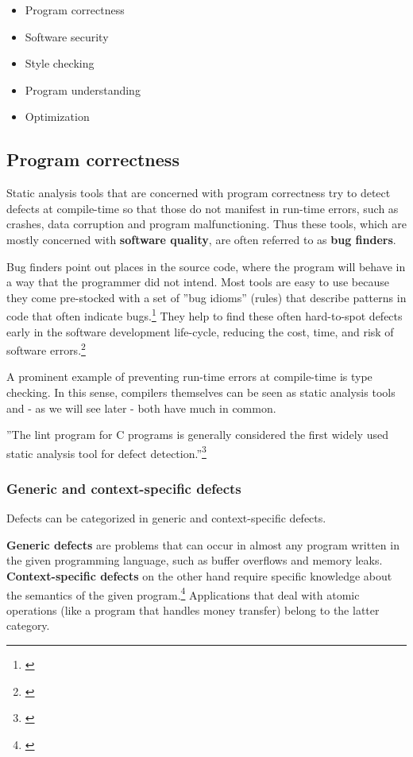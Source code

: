\begin{itemize}\addtolength{\itemsep}{-0.5\baselineskip}
\item Program correctness
\item Software security
\item Style checking
\item Program understanding
\item Optimization
\end{itemize}

\subsection{Program correctness}

Static analysis tools that are concerned with program correctness try to detect defects at compile-time so that those do not manifest in run-time errors, such as crashes, data corruption and program malfunctioning. Thus these tools, which are mostly concerned with \textbf{software quality}, are often referred to as \textbf{bug finders}.

Bug finders point out places in the source code, where the program will behave in a way that the programmer did not intend. Most tools are easy to use because they come pre-stocked with a set of ''bug idioms'' (rules) that describe patterns in code that often indicate bugs.\footnote{\citep[32]{SecureProgramming}} They help to find these often hard-to-spot defects early in the software development life-cycle, reducing the cost, time, and risk of software errors.\footnote{\citep{CovertySA}}

A prominent example of preventing run-time errors at compile-time is type checking. In this sense, compilers themselves can be seen as static analysis tools and - as we will see later - both have much in common.

''The lint program for C programs is generally considered the first widely used static analysis tool for defect detection.''\footnote{\citep[1]{UsingSAToFindBugs}}

\subsubsection{Generic and context-specific defects}

Defects can be categorized in generic and context-specific defects.

\textbf{Generic defects} are problems that can occur in almost any program written in the given programming language, such as buffer overflows and memory leaks.\\
\textbf{Context-specific defects} on the other hand require specific knowledge about the semantics of the given program.\footnote{\citep[14]{SecureProgramming}} Applications that deal with atomic operations (like a program that handles money transfer) belong to the latter category.

